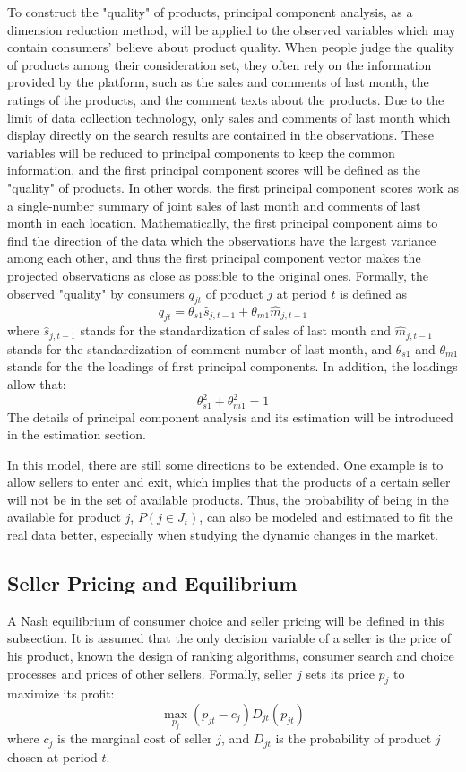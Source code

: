 \documentclass{article}
\begin{document}
To construct the "quality" of products, principal component analysis, as a dimension reduction method, will be applied to the observed variables which may contain consumers' believe about product quality. When people judge the quality of products among their consideration set, they often rely on the information provided by the platform, such as the sales and comments of last month, the ratings of the products, and the comment texts about the products. Due to the limit of data collection technology, only sales and comments of last month which display directly on the search results are contained in the observations. These variables will be reduced to principal components to keep the common information, and the first principal component scores will be defined as the "quality" of products. In other words, the first principal component scores work as a single-number summary of joint sales of last month and comments of last month in each location. Mathematically, the first principal component aims to find the direction of the data which the observations have the largest variance among each other, and thus the first principal component vector makes the projected observations as close as possible to the original ones. Formally, the observed "quality" by consumers $q_{jt}$ of product $j$ at period $t$ is defined as 
$$
q_{jt} = \theta_{s1} \hat{s}_{j,t-1} + \theta_{m1} \hat{m}_{j,t-1}
$$
where $\hat{s}_{j,t-1}$ stands for the standardization of sales of last month and $\hat{m}_{j,t-1}$ stands for the standardization of comment number of last month, and $\theta_{s1}$ and $\theta_{m1}$ stands for the the loadings of first principal components. In addition, the loadings allow that:
$$
\theta_{s1}^2+\theta_{m1}^2=1
$$
The details of principal component analysis and its estimation will be introduced in the estimation section. 

In this model, there are still some directions to be extended. One example is to allow sellers to enter and exit, which implies that the products of a certain seller will not be in the set of available products. Thus, the probability of being in the available for product $j$, $P(j \in J_t)$, can also be modeled and estimated to fit the real data better, especially when studying the dynamic changes in the market.  

\subsection{Seller Pricing and Equilibrium}
A Nash equilibrium of consumer choice and seller pricing will be defined in this subsection. It is assumed that the only decision variable of a seller is the price of his product, known the design of ranking algorithms, consumer search and choice processes and prices of other sellers. Formally, seller $j$ sets its price $p_j$ to maximize its profit:
$$
\max_{p_j} (p_{jt}-c_{j})D_{jt}(p_{jt})
$$
where $c_{j}$ is the marginal cost of seller $j$, and $D_{jt}$ is the probability of product $j$ chosen at period $t$.  
\end{document}
